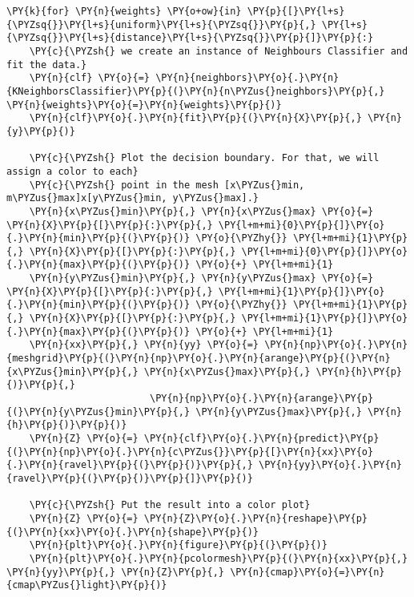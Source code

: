 \begin{notebookcell}[]
\begin{addmargin}[\cellleftmargin]{0em}
{\begin{Verbatim}[commandchars=\\\{\}]
\PY{k}{for} \PY{n}{weights} \PY{o+ow}{in} \PY{p}{[}\PY{l+s}{\PYZsq{}}\PY{l+s}{uniform}\PY{l+s}{\PYZsq{}}\PY{p}{,} \PY{l+s}{\PYZsq{}}\PY{l+s}{distance}\PY{l+s}{\PYZsq{}}\PY{p}{]}\PY{p}{:}
    \PY{c}{\PYZsh{} we create an instance of Neighbours Classifier and fit the data.}
    \PY{n}{clf} \PY{o}{=} \PY{n}{neighbors}\PY{o}{.}\PY{n}{KNeighborsClassifier}\PY{p}{(}\PY{n}{n\PYZus{}neighbors}\PY{p}{,} \PY{n}{weights}\PY{o}{=}\PY{n}{weights}\PY{p}{)}
    \PY{n}{clf}\PY{o}{.}\PY{n}{fit}\PY{p}{(}\PY{n}{X}\PY{p}{,} \PY{n}{y}\PY{p}{)}

    \PY{c}{\PYZsh{} Plot the decision boundary. For that, we will assign a color to each}
    \PY{c}{\PYZsh{} point in the mesh [x\PYZus{}min, m\PYZus{}max]x[y\PYZus{}min, y\PYZus{}max].}
    \PY{n}{x\PYZus{}min}\PY{p}{,} \PY{n}{x\PYZus{}max} \PY{o}{=} \PY{n}{X}\PY{p}{[}\PY{p}{:}\PY{p}{,} \PY{l+m+mi}{0}\PY{p}{]}\PY{o}{.}\PY{n}{min}\PY{p}{(}\PY{p}{)} \PY{o}{\PYZhy{}} \PY{l+m+mi}{1}\PY{p}{,} \PY{n}{X}\PY{p}{[}\PY{p}{:}\PY{p}{,} \PY{l+m+mi}{0}\PY{p}{]}\PY{o}{.}\PY{n}{max}\PY{p}{(}\PY{p}{)} \PY{o}{+} \PY{l+m+mi}{1}
    \PY{n}{y\PYZus{}min}\PY{p}{,} \PY{n}{y\PYZus{}max} \PY{o}{=} \PY{n}{X}\PY{p}{[}\PY{p}{:}\PY{p}{,} \PY{l+m+mi}{1}\PY{p}{]}\PY{o}{.}\PY{n}{min}\PY{p}{(}\PY{p}{)} \PY{o}{\PYZhy{}} \PY{l+m+mi}{1}\PY{p}{,} \PY{n}{X}\PY{p}{[}\PY{p}{:}\PY{p}{,} \PY{l+m+mi}{1}\PY{p}{]}\PY{o}{.}\PY{n}{max}\PY{p}{(}\PY{p}{)} \PY{o}{+} \PY{l+m+mi}{1}
    \PY{n}{xx}\PY{p}{,} \PY{n}{yy} \PY{o}{=} \PY{n}{np}\PY{o}{.}\PY{n}{meshgrid}\PY{p}{(}\PY{n}{np}\PY{o}{.}\PY{n}{arange}\PY{p}{(}\PY{n}{x\PYZus{}min}\PY{p}{,} \PY{n}{x\PYZus{}max}\PY{p}{,} \PY{n}{h}\PY{p}{)}\PY{p}{,}
                         \PY{n}{np}\PY{o}{.}\PY{n}{arange}\PY{p}{(}\PY{n}{y\PYZus{}min}\PY{p}{,} \PY{n}{y\PYZus{}max}\PY{p}{,} \PY{n}{h}\PY{p}{)}\PY{p}{)}
    \PY{n}{Z} \PY{o}{=} \PY{n}{clf}\PY{o}{.}\PY{n}{predict}\PY{p}{(}\PY{n}{np}\PY{o}{.}\PY{n}{c\PYZus{}}\PY{p}{[}\PY{n}{xx}\PY{o}{.}\PY{n}{ravel}\PY{p}{(}\PY{p}{)}\PY{p}{,} \PY{n}{yy}\PY{o}{.}\PY{n}{ravel}\PY{p}{(}\PY{p}{)}\PY{p}{]}\PY{p}{)}

    \PY{c}{\PYZsh{} Put the result into a color plot}
    \PY{n}{Z} \PY{o}{=} \PY{n}{Z}\PY{o}{.}\PY{n}{reshape}\PY{p}{(}\PY{n}{xx}\PY{o}{.}\PY{n}{shape}\PY{p}{)}
    \PY{n}{plt}\PY{o}{.}\PY{n}{figure}\PY{p}{(}\PY{p}{)}
    \PY{n}{plt}\PY{o}{.}\PY{n}{pcolormesh}\PY{p}{(}\PY{n}{xx}\PY{p}{,} \PY{n}{yy}\PY{p}{,} \PY{n}{Z}\PY{p}{,} \PY{n}{cmap}\PY{o}{=}\PY{n}{cmap\PYZus{}light}\PY{p}{)}


\end{Verbatim}}
\end{addmargin}
\end{notebookcell}
